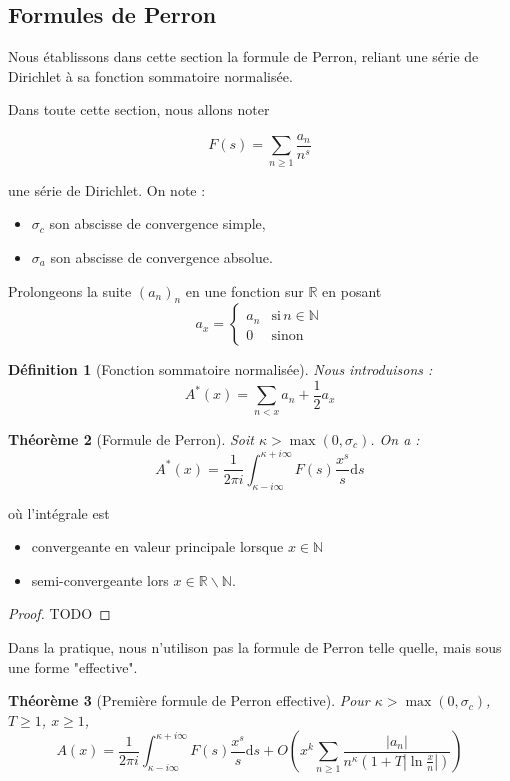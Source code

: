 \documentclass[french]{report}
\newtheorem{theorem}{Théorème}[section]
\newtheorem{definition}[theorem]{Définition}
\begin{document}
\subsection{Formules de Perron}

Nous établissons dans cette section la formule de Perron, reliant une série de Dirichlet à sa fonction sommatoire normalisée.

Dans toute cette section, nous allons noter

\[ F(s) =\sum_{n\geq1}\frac{a_n}{n^s}\]

une série de Dirichlet. On note :
\begin{itemize}
  \item $\sigma_c$ son abscisse de convergence simple,
  \item $\sigma_a$ son abscisse de convergence absolue.
\end{itemize}

Prolongeons la suite $(a_n)_n$ en une fonction sur $\mathbb{R}$ en posant
\[
  a_x=
  \begin{cases}
    a_n & \text{si}\,n\in\mathbb{N} \\
    0  & \text{sinon}
  \end{cases}
\]
\begin{definition}[Fonction sommatoire normalisée]
  Nous introduisons :
  \[ A^*(x) = \sum_{n<x}a_n + \frac{1}{2}a_x \]
\end{definition}

\begin{theorem}[Formule de Perron]
  Soit $\kappa>\max(0,\sigma_c)$. On a :
  \[ A^*(x) = \frac{1}{2\pi i}\int_{\kappa-i\infty}^{\kappa+i\infty}F(s)\frac{x^s}{s}\mathrm{d}s \]
\end{theorem}

où l'intégrale est
\begin{itemize}
  \item convergeante en valeur principale lorsque $x\in\mathbb{N}$
  \item semi-convergeante lors $x\in\mathbb{R}\backslash\mathbb{N}$.
\end{itemize}

\begin{proof}
  TODO
\end{proof}


Dans la pratique, nous n'utilison pas la formule de Perron telle quelle, mais sous une forme "effective".

\begin{theorem}[Première formule de Perron effective]
  Pour $\kappa>\max(0,\sigma_c)$, $T\geq1$, $x\geq1$,
  \[ A(x) = \frac{1}{2\pi i}\int_{\kappa-i\infty}^{\kappa+i\infty}F(s)\frac{x^s}{s}\mathrm{d}s + O\left(x^k\sum_{n\geq1}\frac{|a_n|}{n^\kappa(1+T|\ln\frac{x}{n}|)}\right) \]
\end{theorem}
\end{document}
